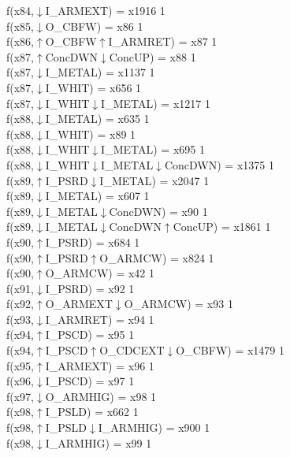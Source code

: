f(x84,$\downarrow$I\_ARMEXT) = x1916 {1} \\
f(x85,$\downarrow$O\_CBFW) = x86 {1} \\
f(x86,$\uparrow$O\_CBFW$\uparrow$I\_ARMRET) = x87 {1} \\
f(x87,$\uparrow$ConcDWN$\downarrow$ConcUP) = x88 {1} \\
f(x87,$\downarrow$I\_METAL) = x1137 {1} \\
f(x87,$\downarrow$I\_WHIT) = x656 {1} \\
f(x87,$\downarrow$I\_WHIT$\downarrow$I\_METAL) = x1217 {1} \\
f(x88,$\downarrow$I\_METAL) = x635 {1} \\
f(x88,$\downarrow$I\_WHIT) = x89 {1} \\
f(x88,$\downarrow$I\_WHIT$\downarrow$I\_METAL) = x695 {1} \\
f(x88,$\downarrow$I\_WHIT$\downarrow$I\_METAL$\downarrow$ConcDWN) = x1375 {1} \\
f(x89,$\uparrow$I\_PSRD$\downarrow$I\_METAL) = x2047 {1} \\
f(x89,$\downarrow$I\_METAL) = x607 {1} \\
f(x89,$\downarrow$I\_METAL$\downarrow$ConcDWN) = x90 {1} \\
f(x89,$\downarrow$I\_METAL$\downarrow$ConcDWN$\uparrow$ConcUP) = x1861 {1} \\
f(x90,$\uparrow$I\_PSRD) = x684 {1} \\
f(x90,$\uparrow$I\_PSRD$\uparrow$O\_ARMCW) = x824 {1} \\
f(x90,$\uparrow$O\_ARMCW) = x42 {1} \\
f(x91,$\downarrow$I\_PSRD) = x92 {1} \\
f(x92,$\uparrow$O\_ARMEXT$\downarrow$O\_ARMCW) = x93 {1} \\
f(x93,$\downarrow$I\_ARMRET) = x94 {1} \\
f(x94,$\uparrow$I\_PSCD) = x95 {1} \\
f(x94,$\uparrow$I\_PSCD$\uparrow$O\_CDCEXT$\downarrow$O\_CBFW) = x1479 {1} \\
f(x95,$\uparrow$I\_ARMEXT) = x96 {1} \\
f(x96,$\downarrow$I\_PSCD) = x97 {1} \\
f(x97,$\downarrow$O\_ARMHIG) = x98 {1} \\
f(x98,$\uparrow$I\_PSLD) = x662 {1} \\
f(x98,$\uparrow$I\_PSLD$\downarrow$I\_ARMHIG) = x900 {1} \\
f(x98,$\downarrow$I\_ARMHIG) = x99 {1} \\
